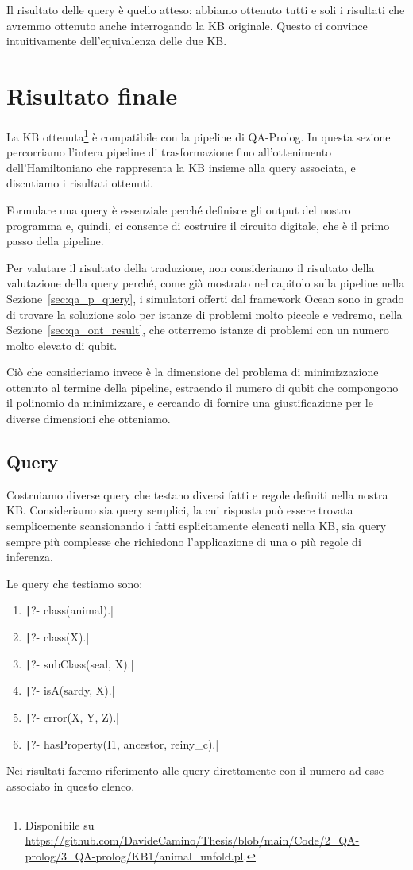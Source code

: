 Il risultato delle query è quello atteso: abbiamo ottenuto tutti e soli i risultati che avremmo ottenuto anche interrogando la KB originale. Questo ci convince intuitivamente dell'equivalenza delle due KB.

\section{Risultato finale}
La KB ottenuta\footnote{Disponibile su \url{https://github.com/DavideCamino/Thesis/blob/main/Code/2_QA-prolog/3_QA-prolog/KB1/animal_unfold.pl}.} è compatibile con la pipeline di QA-Prolog. In questa sezione percorriamo l'intera pipeline di trasformazione fino all'ottenimento dell'Hamiltoniano che rappresenta la KB insieme alla query associata, e discutiamo i risultati ottenuti.

Formulare una query è essenziale perché definisce gli output del nostro programma e, quindi, ci consente di costruire il circuito digitale, che è il primo passo della pipeline.

Per valutare il risultato della traduzione, non consideriamo il risultato della valutazione della query perché, come già mostrato nel capitolo sulla pipeline nella Sezione~\ref{sec:qa_p_query}, i simulatori offerti dal framework Ocean sono in grado di trovare la soluzione solo per istanze di problemi molto piccole e vedremo, nella Sezione~\ref{sec:qa_ont_result}, che otterremo istanze di problemi con un numero molto elevato di qubit. 

Ciò che consideriamo invece è la dimensione del problema di minimizzazione ottenuto al termine della pipeline, estraendo il numero di qubit che compongono il polinomio da minimizzare, e cercando di fornire una giustificazione per le diverse dimensioni che otteniamo.

\subsection{Query}
Costruiamo diverse query che testano diversi fatti e regole definiti nella nostra KB. Consideriamo sia query semplici, la cui risposta può essere trovata semplicemente scansionando i fatti esplicitamente elencati nella KB, sia query sempre più complesse che richiedono l'applicazione di una o più regole di inferenza.

Le query che testiamo sono:
\begin{enumerate}
	\item \texttt|?- class(animal).|
	\item \texttt|?- class(X).|
	\item \texttt|?- subClass(seal, X).|
	\item \texttt|?- isA(sardy, X).|
	\item \texttt|?- error(X, Y, Z).|	
	\item \texttt|?- hasProperty(I1, ancestor, reiny_c).|
\end{enumerate}
Nei risultati faremo riferimento alle query direttamente con il numero ad esse associato in questo elenco.

